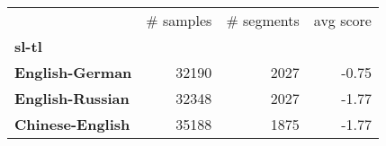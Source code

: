 \begin{tabular}{lrrr}
\toprule
{} &  # samples &  # segments &  avg score \\
\textbf{sl-tl          } &            &             &            \\
\midrule
\textbf{English-German } &      32190 &        2027 &      -0.75 \\
\textbf{English-Russian} &      32348 &        2027 &      -1.77 \\
\textbf{Chinese-English} &      35188 &        1875 &      -1.77 \\
\bottomrule
\end{tabular}
